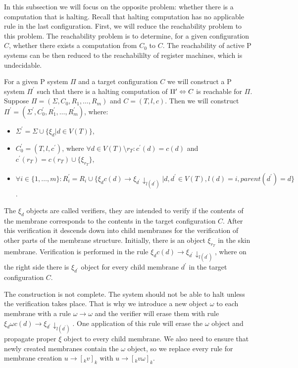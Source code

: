 In this subsection we will focus on the opposite problem: whether there is a computation that is halting. Recall that halting computation has no applicable rule in the last configuration.
First, we will reduce the reachability problem to this problem. The reachability problem is to determine, for a given configuration $C$, whether there exists a computation from $C_0$ to $C$. The reachability of active P systems can be then reduced to the reachabililty of register machines, which is undecidable.

For a given P system $\Pi$ and a target configuration $C$ we will construct a P system $\Pi^\prime$ such that there is a halting computation of $\Pi^\prime\Leftrightarrow\linebreak C$ is reachable for $\Pi$. Suppose $\Pi = (\Sigma, C_0, R_1, \ldots, R_m)$ and $C = (T, l, c)$. Then we will construct $\Pi^\prime = (\Sigma^\prime, C_0^\prime, R_1^\prime, \ldots, R_m^\prime)$, where:

\begin{itemize}
  \item $\Sigma^\prime = \Sigma\cup\{\xi_d|d\in V(T)\}$,
  \item $C_0^\prime = (T, l, c^\prime)$, where $\forall d\in V(T)\setminus r_T: c^\prime(d) = c(d)$ and $c^\prime(r_T) = c(r_T)\cup\{\xi_{r_T}\}$,
  \item $\forall i\in\{1,\ldots, m\}: R_i^\prime = R_i\cup\{\xi_d c(d)\rightarrow\xi_{d^\prime}\downarrow_{l(d^\prime)}|d,d^\prime\in V(T),l(d)=i,parent(d^\prime)=d\}$.
\end{itemize}

The $\xi_d$ objects are called verifiers, they are intended to verify if the contents of the membrane corresponds to the contents in the target configuration $C$. After this verification it descends down into child membranes for the verification of other parts of the membrane structure.
Initially, there is an object $\xi_{r_T}$ in the skin membrane. Verification is performed in the rule $\xi_d c(d)\rightarrow\xi_{d^\prime}\downarrow_{l(d^\prime)}$, where on the right side there is $\xi_{d^\prime}$ object for every child membrane $d^\prime$ in the target configuration $C$.

The construction is not complete. The system should not be able to halt unless the verification takes place. That is why we introduce a new object $\omega$ to each membrane with a rule $\omega\rightarrow\omega$ and the verifier will erase them with rule $\xi_d\omega c(d)\rightarrow\xi_{d^\prime}\downarrow_{l(d^\prime)}$. One application of this rule will erase the $\omega$ object and propagate proper $\xi$ object to every child membrane. We also need to ensure that newly created membranes contain the $\omega$ object, so we replace every rule for membrane creation $u\rightarrow [_k v]_k$ with $u\rightarrow [_k v\omega]_k$.

